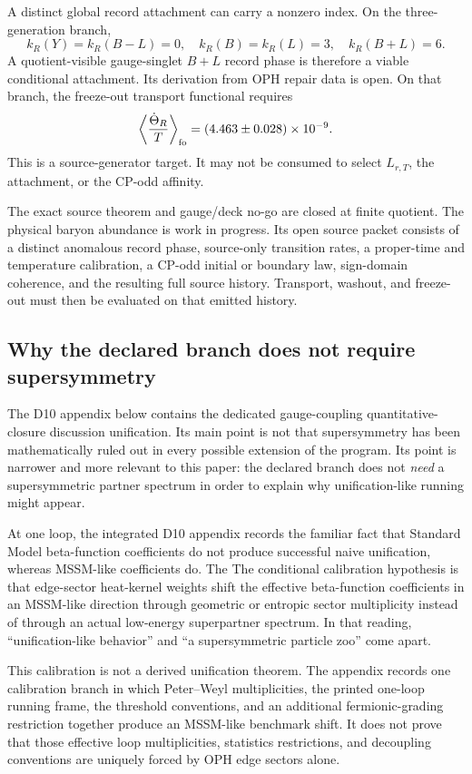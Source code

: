 \documentclass[11pt]{article}
\begin{document}
A distinct global record attachment can carry a nonzero index. On the
three-generation branch,
\[
k_R(Y)=k_R(B-L)=0,
\quad k_R(B)=k_R(L)=3,
\quad k_R(B+L)=6.
\]
A quotient-visible gauge-singlet \(B+L\) record phase is therefore a viable
conditional attachment. Its derivation from OPH repair data is open. On
that branch, the freeze-out transport functional requires
\[
\left\langle\frac{\dot\Theta_R}{T}\right\rangle_{\rm fo}
=(4.463\pm0.028)\times10^{-9}.
\]
This is a source-generator target. It may not be consumed to select
\(L_{r,T}\), the attachment, or the CP-odd affinity.

The exact source theorem and gauge/deck no-go are closed at finite quotient.
The physical baryon abundance is work in progress. Its open source
packet consists of a distinct anomalous record phase, source-only transition
rates, a proper-time and temperature calibration, a CP-odd initial or boundary
law, sign-domain coherence, and the resulting full source history. Transport,
washout, and freeze-out must then be evaluated on that emitted history.

\subsection{Why the declared branch does not require supersymmetry}

The D10 appendix below contains the dedicated gauge-coupling quantitative-closure discussion
unification. Its main point is not that supersymmetry has been mathematically ruled out in every
possible extension of the program. Its point is narrower and more relevant to this paper: the declared
branch does not \emph{need} a supersymmetric partner spectrum in order to explain why
unification-like running might appear.

At one loop, the integrated D10 appendix records the familiar fact that Standard Model beta-function
coefficients do not produce successful naive unification, whereas MSSM-like coefficients do. The
The conditional calibration hypothesis is that edge-sector heat-kernel weights shift the effective
beta-function coefficients in an MSSM-like direction through geometric or entropic sector
multiplicity instead of through an actual low-energy superpartner spectrum. In that reading,
``unification-like behavior'' and ``a supersymmetric particle zoo'' come apart.

This calibration is not a derived unification theorem. The appendix records one
calibration branch in which Peter--Weyl multiplicities, the printed one-loop running frame, the
threshold conventions, and an additional fermionic-grading restriction together produce an
MSSM-like benchmark shift. It does not prove that those effective loop multiplicities,
statistics restrictions, and decoupling conventions are uniquely forced by OPH edge sectors alone.
\end{document}
